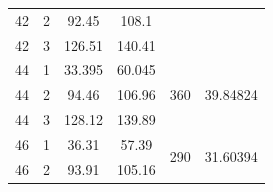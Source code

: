 \documentclass[%
 reprint,
nofootinbib,
 amsmath,amssymb,
 aps,
floatfix,
]{revtex4-2}
\begin{document}
\begin{table}[]
\begin{tabular}{@{}cccccc@{}}
    42                                             & 2                                                 & 92.45                                             & 108.1                                             &                                                  &                                                     \\
    42                                             & 3                                                 & 126.51                                            & 140.41                                            &                                                  &                                                     \\
    44                                             & 1                                                 & 33.395                                            & 60.045                                            & \multirow{3}{*}{360}                             & \multirow{3}{*}{39.84824}                           \\
    44                                             & 2                                                 & 94.46                                             & 106.96                                            &                                                  &                                                     \\
    44                                             & 3                                                 & 128.12                                            & 139.89                                            &                                                  &                                                     \\
    46                                             & 1                                                 & 36.31                                             & 57.39                                             & \multirow{2}{*}{290}                             & \multirow{2}{*}{31.60394}                           \\
    46                                             & 2                                                 & 93.91                                             & 105.16                                            &                                                  &                                                     \\ \bottomrule
    \end{tabular}
    \end{table}
\end{document}
